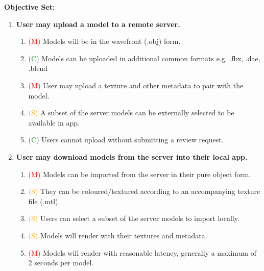 \documentclass{article}
\newcommand{\must}[1]{\textcolor{red}{#1}}
\newcommand{\should}[1]{\textcolor{orange}{#1}}
\newcommand{\could}[1]{\textcolor{green}{#1}}
\begin{document}
\textbf{Objective Set:}
\begin{enumerate}[label=\Roman*.]
\item \textbf{User may upload a model to a remote server.}
    \begin{enumerate}[label=\arabic*.]
    \item \must{(M)} Models will be in the wavefront (.obj) form.
    \item \could{(C)} Models can be uploaded in additional common formats e.g. .fbx, .dae, .blend
    \item \must{(M)} User may upload a texture and other metadata to pair with the model.
    \item \should{(S)} A subset of the server models can be externally selected to be available in app.
    \item \could{(C)} Users cannot upload without submitting a review request.
    \end{enumerate}
    
\item \textbf{User may download models from the server into their local app.}
    \begin{enumerate}[label=\arabic*.]
    \item \must{(M)} Models can be imported from the server in their pure object form.
    \item \should{(S)} They can be coloured/textured according to an accompanying texture file (.mtl).
    \item \should{(S)} Users can select a subset of the server models to import locally.
    \item \should{(S)} Models will render with their textures and metadata.
    \item \must{(M)} Models will render with reasonable latency, generally a maximum of 2 seconds per model.
    \end{enumerate}


\end{enumerate}
\end{document}
